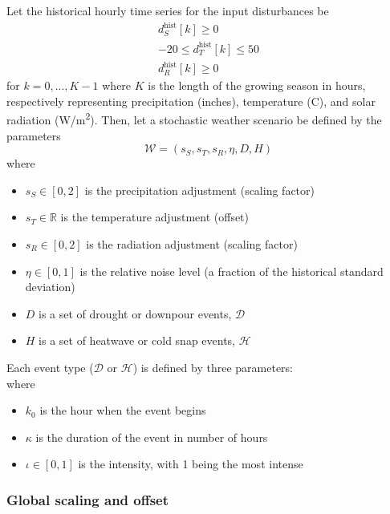 \documentclass[pdflatex,sn-mathphys-num]{sn-jnl}
\begin{document}
Let the historical hourly time series for the input disturbances be
\begin{gather}
d_{S}^{\text{hist}}[k] \geq 0           \\
-20 \leq d_{T}^{\text{hist}}[k] \leq 50 \\
d_{R}^{\text{hist}}[k] \geq 0
\label{eqn:history}
\end{gather}
for $k=0,...,K-1$ where $K$ is the length of the growing season in hours, respectively representing precipitation (inches), temperature (\textdegree C), and solar radiation (W/m\textsuperscript{2}). Then, let a stochastic weather scenario be defined by the parameters
\begin{equation}
\mathcal{W} = (s_{S}, s_{T}, s_{R}, \eta, D, H)
\label{eqn:weather-scenario}
\end{equation}
where
\begin{itemize}
\item $s_{S} \in [0, 2]$ is the precipitation adjustment (scaling factor)
\item $s_{T} \in \mathbb{R}$ is the temperature adjustment (offset)
\item $s_{R} \in [0, 2]$ is the radiation adjustment (scaling factor)
\item $\eta \in [0, 1]$ is the relative noise level (a fraction of the historical standard deviation)
\item $D$ is a set of drought or downpour events, $\mathcal{D}$
\item $H$ is a set of heatwave or cold snap events, $\mathcal{H}$
\end{itemize}

Each event type ($\mathcal{D}$ or $\mathcal{H}$) is defined by three parameters:
\begin{equation}
[k_{0}, \kappa, \iota]
\label{eqn:event}
\end{equation}
where
\begin{itemize}
\item $k_{0}$ is the hour when the event begins
\item $\kappa$ is the duration of the event in number of hours
\item $\iota\in[0,1]$ is the intensity, with 1 being the most intense
\end{itemize}

\subsubsection{Global scaling and offset}\label{subsubsec:weather-step-1}
\end{document}
